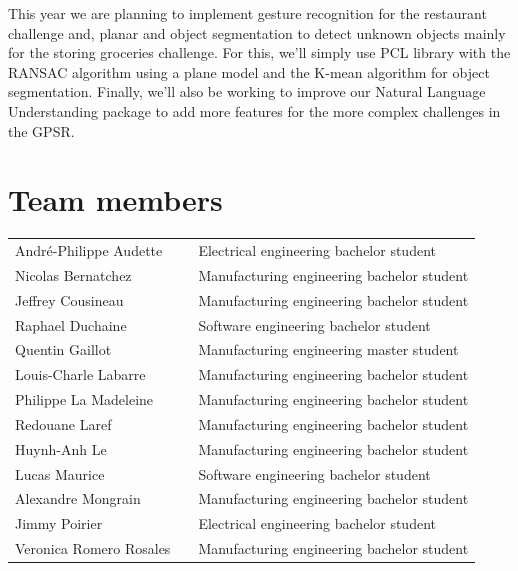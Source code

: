 \documentclass[runningheads,a4paper]{llncs}
\begin{document}
This year we are planning to implement gesture recognition for the restaurant challenge and, planar and object segmentation to detect unknown objects mainly for the storing groceries challenge. For this, we'll simply use PCL library with the RANSAC algorithm using a plane model and the K-mean algorithm for object segmentation. Finally, we'll also be working to improve our Natural Language Understanding package to add more features for the more complex challenges in the GPSR.\\ 






	
\section*{Team members}

\begin{tabular}{lll}
   
André-Philippe Audette &    & 	Electrical engineering bachelor student \\
Nicolas Bernatchez &    & 		Manufacturing engineering bachelor student \\
Jeffrey Cousineau &    & 		Manufacturing engineering bachelor student \\
Raphael Duchaine &    & 		Software engineering bachelor student \\
Quentin Gaillot &    & 			Manufacturing engineering master student \\
Louis-Charle Labarre &    & 	Manufacturing engineering bachelor student \\ 
Philippe La Madeleine &    & 	Manufacturing engineering bachelor student \\ 
Redouane Laref &    & 			Manufacturing engineering bachelor student \\
Huynh-Anh Le &    & 			Manufacturing engineering bachelor student \\
Lucas Maurice &    & 			Software engineering bachelor student \\
Alexandre Mongrain  &    & 		Manufacturing engineering bachelor student \\
Jimmy Poirier &    & 			Electrical engineering bachelor student \\
Veronica Romero Rosales  &   & Manufacturing engineering bachelor student \\

\end{tabular}
\end{document}
